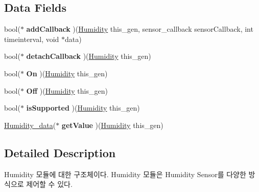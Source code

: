\subsection*{Data Fields}
\begin{DoxyCompactItemize}
\item 
\hypertarget{struct__Humidity_ae020e34ba54ea361a9fabce5bc3e9467}{bool($\ast$ {\bfseries add\-Callback} )(\hyperlink{struct__Humidity}{Humidity} this\-\_\-gen, sensor\-\_\-callback sensor\-Callback, int timeinterval, void $\ast$data)}\label{struct__Humidity_ae020e34ba54ea361a9fabce5bc3e9467}

\item 
\hypertarget{struct__Humidity_ae00fb0f7d2a7a4c1f3a865019ddf157c}{bool($\ast$ {\bfseries detach\-Callback} )(\hyperlink{struct__Humidity}{Humidity} this\-\_\-gen)}\label{struct__Humidity_ae00fb0f7d2a7a4c1f3a865019ddf157c}

\item 
\hypertarget{struct__Humidity_a0feebb4da2daa33a6a2c44caafc985b4}{bool($\ast$ {\bfseries On} )(\hyperlink{struct__Humidity}{Humidity} this\-\_\-gen)}\label{struct__Humidity_a0feebb4da2daa33a6a2c44caafc985b4}

\item 
\hypertarget{struct__Humidity_a67ae0522e0566cf1ee22346f1e45a41b}{bool($\ast$ {\bfseries Off} )(\hyperlink{struct__Humidity}{Humidity} this\-\_\-gen)}\label{struct__Humidity_a67ae0522e0566cf1ee22346f1e45a41b}

\item 
\hypertarget{struct__Humidity_adda26eb4f1a4ee9bda6cacbbe67ec5b4}{bool($\ast$ {\bfseries is\-Supported} )(\hyperlink{struct__Humidity}{Humidity} this\-\_\-gen)}\label{struct__Humidity_adda26eb4f1a4ee9bda6cacbbe67ec5b4}

\item 
\hypertarget{struct__Humidity_ab66479293e120169b7f5be17bb6b307a}{\hyperlink{Sensor_8h_d9/d9d/struct__Humidity__data}{Humidity\-\_\-data}($\ast$ {\bfseries get\-Value} )(\hyperlink{struct__Humidity}{Humidity} this\-\_\-gen)}\label{struct__Humidity_ab66479293e120169b7f5be17bb6b307a}

\end{DoxyCompactItemize}


\subsection{Detailed Description}
Humidity 모듈에 대한 구조체이다. Humidity 모듈은 Humidity Sensor를 다양한 방식으로 제어할 수 있다. 

